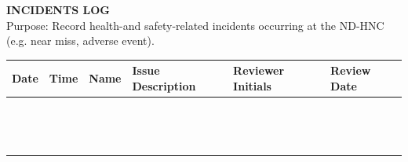\documentclass[11pt, letterpaper]{article}
\begin{document}
\begin{center}
    {\Large \textbf{INCIDENTS LOG}}\\
    \vspace{5pt}
    Purpose: Record health-and safety-related incidents occurring at the ND-HNC (e.g. near miss, adverse event).
\end{center}

\vspace{15pt}

\noindent
\begin{tabularx}{\textwidth}{
    | >{\centering\arraybackslash}m{2cm} |
    >{\centering\arraybackslash}m{1.8cm} |
    >{\centering\arraybackslash}m{2cm} |
    >{\centering\arraybackslash}X |
    >{\centering\arraybackslash}m{2.2cm} |
    >{\centering\arraybackslash}m{2.2cm} |}
    \hline
    \rowcolor{lightgray}
    \textbf{Date} & \textbf{Time} & \textbf{Name} & \textbf{Issue Description} & \textbf{Reviewer Initials} & \textbf{Review Date} \\ \hline
    & & & & & \\[3.5ex] \hline
    & & & & & \\[3.5ex] \hline
    & & & & & \\[3.5ex] \hline
    & & & & & \\[3.5ex] \hline
    & & & & & \\[3.5ex] \hline
    & & & & & \\[3.5ex] \hline
    & & & & & \\[3.5ex] \hline
    & & & & & \\[3.5ex] \hline
    & & & & & \\[3.5ex] \hline
    & & & & & \\[3.5ex] \hline
    & & & & & \\[3.5ex] \hline
    & & & & & \\[3.5ex] \hline
    & & & & & \\[3.5ex] \hline
    & & & & & \\[3.5ex] \hline
\end{tabularx}
\end{document}
